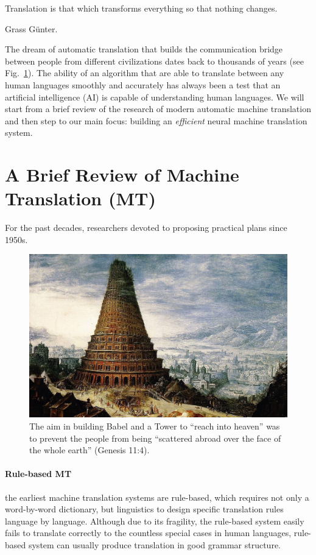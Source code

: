 \epigraph{Translation is that which transforms everything so that nothing changes.}{Grass Günter.}

The dream of automatic translation that builds the communication bridge between people from different civilizations dates back to thousands of years (see Fig.~\ref{cp1.fig.babel}). The ability of an algorithm that are able to translate between any human languages smoothly and accurately has always been a test that an artificial intelligence (AI) is capable of understanding human languages. We will start from a brief review of the research of modern automatic machine translation and then step to our main focus: building an {\it efficient} neural machine translation system.

\section{A Brief Review of Machine Translation (MT)}
For the past decades, researchers devoted to proposing practical plans since 1950s.
\begin{figure}[t]
	\centering
	\includegraphics[width=1\linewidth]{figs/intro/tower_of_babel.jpg}
	\caption{\label{cp1.fig.babel}The aim in building Babel and a Tower to “reach into heaven” was to prevent the people from being “scattered abroad over the face of the whole earth” (Genesis 11:4). }
\end{figure}

\paragraph{Rule-based MT} the earliest machine translation systems are rule-based, which requires not only a word-by-word dictionary, but linguistics to design specific translation rules language by language. Although due to its fragility, the rule-based system easily fails to translate correctly to the countless special cases in human languages, rule-based system can usually produce translation in good grammar structure.

